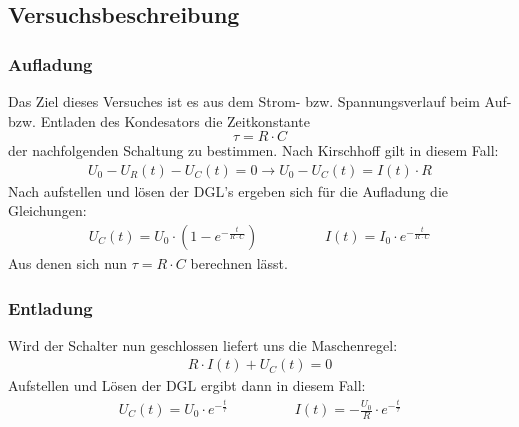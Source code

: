 \documentclass[12pt,a4paper]{article}
\begin{document}
\subsection{Versuchsbeschreibung}
\subsubsection*{Aufladung}
Das Ziel dieses Versuches ist es aus dem Strom- bzw. Spannungsverlauf beim Auf- bzw. Entladen des Kondesators die Zeitkonstante
\[\tau = R \cdot C \]
der nachfolgenden Schaltung zu bestimmen.
Nach Kirschhoff gilt in diesem Fall:
\begin{align*}
U_0-U_R(t)-U_C(t)=0 \rightarrow U_0-U_C(t)=I(t) \cdot R
\end{align*}
Nach aufstellen und lösen der DGL's ergeben sich für die Aufladung die Gleichungen:
\begin{align*}
U_C(t)=U_0 \cdot (1-e^{-\frac{t}{R \cdot C}}) \hspace{2cm} I(t)=I_0 \cdot e^{-\frac{t}{R \cdot C}}
\end{align*}
Aus denen sich nun $\tau=R \cdot C$ berechnen lässt.
\subsubsection*{Entladung}
Wird der Schalter nun geschlossen liefert uns die Maschenregel:
\begin{align*}
R \cdot I(t) + U_C(t) = 0
\end{align*}
Aufstellen und Lösen der DGL ergibt dann in diesem Fall:
\begin{align*}
U_C(t)=U_0 \cdot e^{-\frac{t}{\tau}} \hspace{2cm} I(t)=-\frac{U_0}{R} \cdot e^{-\frac{t}{\tau}}
\end{align*}
\end{document}
